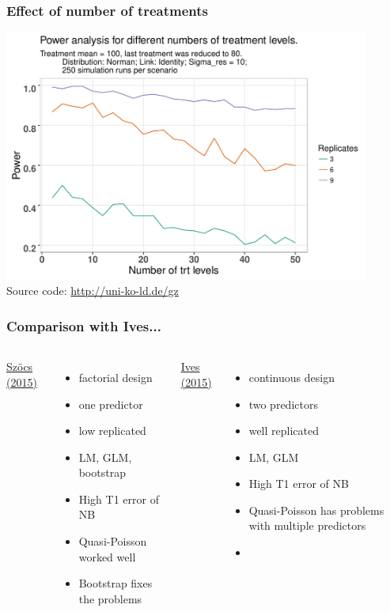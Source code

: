 \documentclass[
	12pt
	]{beamer}
\begin{document}
\begin{frame}
\frametitle{Effect of number of treatments}
	\includegraphics[width =0.9\textwidth]{figs/p_power_trt.pdf} 
	\\ \footnotesize Source code: \url{http://uni-ko-ld.de/gz}
\end{frame}


\begin{frame}
\frametitle{Comparison with Ives...}
	\begin{columns}[T]
	    	\underline{Szöcs (2015)}
	    	\begin{itemize}
	        	\item factorial design
	        	\item one predictor
	        	\item low replicated
	        	\item LM, GLM, bootstrap
	        	\item High T1 error of NB
	        	\item Quasi-Poisson worked well \vspace{1.2em}
	        	\item Bootstrap fixes the problems
	        \end{itemize}
	    	\underline{Ives (2015)}
	        \begin{itemize}
	        	\item continuous design
	        	\item two predictors
	        	\item well replicated
	        	\item LM, GLM
	        	\item High T1 error of NB
	        	\item Quasi-Poisson has problems with multiple predictors
	        	\item
	        \end{itemize}
	\end{columns}
\end{frame}
\end{document}
